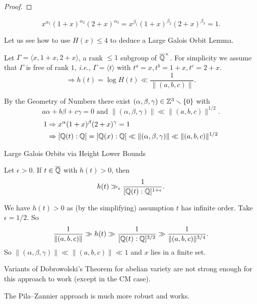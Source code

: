 \documentclass{beamer}
\begin{document}
\begin{frame}
  \begin{proof}
    \vspace{6cm}
  \end{proof}  
\end{frame}

\begin{frame}
  \begin{equation*}
    x^{\alpha_1} (1+x)^{\alpha_2} (2+x)^{\alpha_3} =
    x^{\beta_1} (1+x)^{\beta_2} (2+x)^{\beta_3} = 1.
  \end{equation*}

  Let us see how to use $H(x)\le 4$ to deduce a \alert{Large Galois Orbit
    Lemma}.

  Let $\Gamma = \langle x,1+x,2+x\rangle$, a rank $\le 1$
  subgroup of ${\overline{\mathbb{Q}}}^\times$.
  For \alert{simplicity} we assume that $\Gamma$ is free of rank $1$,
  \textit{i.e.}, $\Gamma = \langle t\rangle$ with
  $t^a=x,t^b=1+x,t^c=2+x$. 
$$
  \Rightarrow h(t) = \log H(t) \ll \frac{1}{\|(a,b,c)\|}.$$

  By the \alert{Geometry of Numbers} there exist
  $(\alpha,\beta,\gamma)\in{\mathbb{Z}}^3\smallsetminus\{0\}$ with
  $$a\alpha+b\beta+c\gamma=0\text{ and }\|(\alpha,\beta,\gamma)\|
  \ll \|(a,b,c)\|^{1/2}.$$
  \begin{alignat*}1
    &\Rightarrow x^\alpha (1+x)^\beta (2+x)^\gamma=1\\
    &\Rightarrow [\IQ(t):\IQ]=[\IQ(x):\IQ] \ll \|(\alpha,\beta,\gamma)\|
  \ll \|(a,b,c)\|^{1/2}
  \end{alignat*}
\end{frame}

\begin{frame}{Large Galois Orbits via Height Lower Bounds}
  \begin{theorem}[Dobrowolski]
    Let $\epsilon > 0$.
    If $t\in{\overline{\mathbb{Q}}}$ with $h(t) > 0$, then
    \begin{equation*}
      h(t) \gg_\epsilon \frac{1}{[{\mathbb{Q}}(t):{\mathbb{Q}}]^{1+\epsilon}}. 
    \end{equation*}
  \end{theorem}
  We have $h(t)>0$ as (by the simplifying) assumption $t$ has infinite
  order.
  Take $\epsilon = 1/2$. So
  \begin{equation*}
    \frac{1}{\|(a,b,c)\|} \gg h(t) \gg \frac{1}{[{\mathbb{Q}}(t):{\mathbb{Q}}]^{3/2}}
    \gg \frac{1}{\|(a,b,c)\|^{3/4}}. 
  \end{equation*}
  So $\|(\alpha,\beta,\gamma)\|\ll \|(a,b,c)\|\ll 1$ and $x$ lies in a
  finite set.

  Variants of Dobrowolski's Theorem for \alert{abelian variety}
  are \alert{not} strong enough
  for this approach to work (except in the CM case).

  The Pila--Zannier approach is much more robust and works.
\end{frame}
\end{document}

